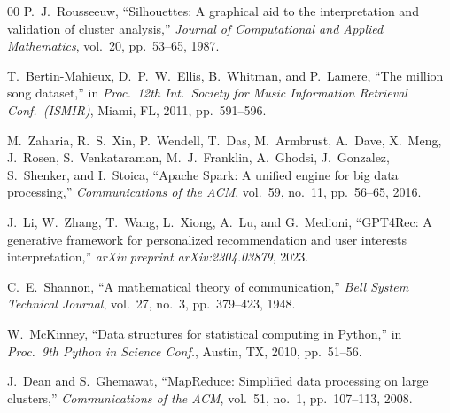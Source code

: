 \documentclass[conference]{IEEEtran}
\begin{document}
\begin{thebibliography}{00}
P.~J.~Rousseeuw, ``Silhouettes: A graphical aid to the interpretation and
validation of cluster analysis,'' \textit{Journal of Computational and
Applied Mathematics}, vol.~20, pp.~53--65, 1987.

T.~Bertin-Mahieux, D.~P.~W.~Ellis, B.~Whitman, and P.~Lamere, ``The million
song dataset,'' in \textit{Proc.\ 12th Int.\ Society for Music Information
Retrieval Conf.\ (ISMIR)}, Miami, FL, 2011, pp.~591--596.

M.~Zaharia, R.~S.~Xin, P.~Wendell, T.~Das, M.~Armbrust, A.~Dave,
X.~Meng, J.~Rosen, S.~Venkataraman, M.~J.~Franklin, A.~Ghodsi,
J.~Gonzalez, S.~Shenker, and I.~Stoica, ``Apache Spark: A unified engine
for big data processing,'' \textit{Communications of the ACM}, vol.~59,
no.~11, pp.~56--65, 2016.

J.~Li, W.~Zhang, T.~Wang, L.~Xiong, A.~Lu, and G.~Medioni, ``GPT4Rec:
A generative framework for personalized recommendation and user interests
interpretation,'' \textit{arXiv preprint arXiv:2304.03879}, 2023.

C.~E.~Shannon, ``A mathematical theory of communication,''
\textit{Bell System Technical Journal}, vol.~27, no.~3, pp.~379--423, 1948.

W.~McKinney, ``Data structures for statistical computing in Python,''
in \textit{Proc.\ 9th Python in Science Conf.}, Austin, TX, 2010,
pp.~51--56.

J.~Dean and S.~Ghemawat, ``MapReduce: Simplified data processing on large
clusters,'' \textit{Communications of the ACM}, vol.~51, no.~1,
pp.~107--113, 2008.

\end{thebibliography}
\end{document}
